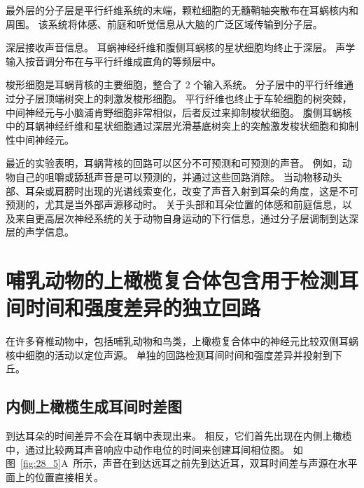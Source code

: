 最外层的分子层是平行纤维系统的末端，颗粒细胞的无髓鞘轴突散布在耳蜗核内和周围。
该系统将体感、前庭和听觉信息从大脑的广泛区域传输到分子层。


深层接收声音信息。
耳蜗神经纤维和腹侧耳蜗核的星状细胞均终止于深层。
声学输入按音调分布在与平行纤维成直角的等频层中。


梭形细胞是耳蜗背核的主要细胞，整合了 2 个输入系统。
分子层中的平行纤维通过分子层顶端树突上的刺激发梭形细胞。
平行纤维也终止于车轮细胞的树突棘，中间神经元与小脑浦肯野细胞非常相似，后者反过来抑制梭状细胞。
腹侧耳蜗核中的耳蜗神经纤维和星状细胞通过深层光滑基底树突上的突触激发梭状细胞和抑制性中间神经元。


最近的实验表明，耳蜗背核的回路可以区分不可预测和可预测的声音。
例如，动物自己的咀嚼或舔舐声音是可以预测的，并通过这些回路消除。
当动物移动头部、耳朵或肩膀时出现的光谱线索变化，改变了声音入射到耳朵的角度，这是不可预测的，尤其是当外部声源移动时。
关于头部和耳朵位置的体感和前庭信息，以及来自更高层次神经系统的关于动物自身运动的下行信息，通过分子层调制到达深层的声学信息。



\section{哺乳动物的上橄榄复合体包含用于检测耳间时间和强度差异的独立回路}

在许多脊椎动物中，包括哺乳动物和鸟类，上橄榄复合体中的神经元比较双侧耳蜗核中细胞的活动以定位声源。
单独的回路检测耳间时间和强度差异并投射到下丘。



\subsection{内侧上橄榄生成耳间时差图}

到达耳朵的时间差异不会在耳蜗中表现出来。
相反，它们首先出现在内侧上橄榄中，通过比较两耳声音响应中动作电位的时间来创建耳间相位图。
如图~\ref{fig:28_5}A~所示，声音在到达远耳之前先到达近耳，双耳时间差与声源在水平面上的位置直接相关。


